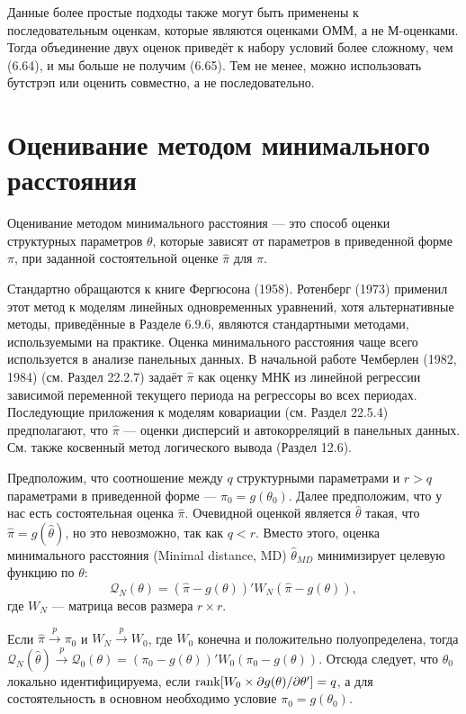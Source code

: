 Данные более простые подходы также могут быть применены к последовательным оценкам, которые являются оценками ОММ, а не М-оценками. Тогда объединение двух оценок приведёт к набору условий более сложному, чем (6.64), и мы больше не получим (6.65). Тем не менее, можно использовать бутстрэп или оценить совместно, а не последовательно.

\section{Оценивание методом минимального расстояния}

Оценивание методом минимального расстояния --- это способ оценки структурных параметров $\theta$, которые зависят от параметров в приведенной форме $\pi$, при заданной состоятельной оценке $\hat{\pi}$ для $\pi$.

Стандартно обращаются к книге Фергюсона (1958). Ротенберг (1973) применил этот метод к моделям линейных одновременных уравнений, хотя альтернативные методы, приведённые в Разделе 6.9.6, являются стандартными методами, используемыми на практике. Оценка минимального расстояния чаще всего используется в анализе панельных данных. В начальной работе Чемберлен (1982, 1984) (см. Раздел 22.2.7) задаёт $\hat{\pi}$ как оценку МНК из линейной регрессии зависимой переменной текущего периода на регрессоры во всех периодах. Последующие приложения к моделям ковариации (см. Раздел 22.5.4) предполагают, что $\hat{\pi}$ --- оценки дисперсий и автокорреляций в панельных данных. См. также косвенный метод логического вывода (Раздел 12.6).

Предположим, что соотношение между $q$ структурными параметрами и $r > q$ параметрами в приведенной форме --- $\pi_0=g(\theta_0)$. Далее предположим, что у нас есть состоятельная оценка $\hat{\pi}$. Очевидной оценкой является $\hat{\theta}$ такая, что $\hat{\pi}=g(\hat{\theta})$, но это невозможно, так как $q < r$. Вместо этого, оценка минимального расстояния (Minimal distance, MD) $\hat{\theta}_{MD}$ минимизирует целевую функцию по $\theta$:
\begin{equation}
\mathcal{Q}_{N}(\theta)=(\hat{\pi}-g(\theta))' W_N (\hat{\pi}-g(\theta)),
\end{equation}
где $W_N$ --- матрица весов размера $r \times r$.

Если $\hat{\pi} \xrightarrow{p} \pi_0$ и $W_N \xrightarrow{p} W_0$, где $W_0$ конечна и положительно полуопределена, тогда $\mathcal{Q}_{N}(\hat{\theta}) \xrightarrow{p} \mathcal{Q}_{0}(\theta)=(\pi_0-g(\theta))' W_0 (\pi_0-g(\theta))$. Отсюда следует, что $\theta_0$ локально идентифицируема, если 
$ \mathrm{rank} [W_0 \times \partial g(\theta) / \partial \theta']=q$, а для состоятельность в основном необходимо условие $\pi_0=g(\theta_0)$.

